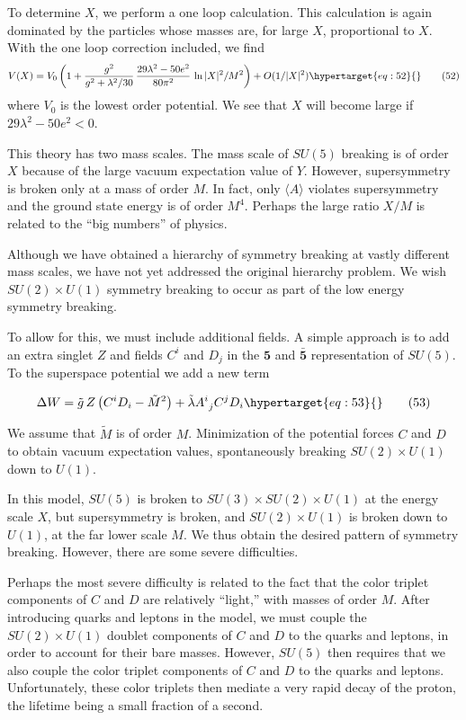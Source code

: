\documentclass[11pt,a4paper]{article}
\newcommand{\eqtarget}[1]{\hypertarget{eq:#1}{\mathstrut}\tag{#1}}
\begin{document}
To determine $X$, we perform a one loop calculation. This calculation
is again dominated by the particles whose masses are, for
large $X$, proportional to $X$. With the one loop correction included,
we find
\begin{equation}
V(X) = V_0 \left(1 + \frac{g^2}{g^2 + \lambda^2/30}\,\frac{29\lambda^2 - 50e^2}{80\pi^2}\,\ln |X|^2/M^2\right) + O(1/|X|^2)
\eqtarget{52}
\end{equation}
where $V_0$ is the lowest order potential. We see that $X$ will become
large if $29\lambda^2 - 50e^2 < 0$.

This theory has two mass scales. The mass scale of $SU(5)$ breaking
is of order $X$ because of the large vacuum expectation value of $Y$.
However, supersymmetry is broken only at a mass of order $M$. In fact,
only $\langle A\rangle$ violates supersymmetry and the ground state energy is of
order $M^4$. Perhaps the large ratio $X/M$ is related to the ``big numbers''
of physics.

Although we have obtained a hierarchy of symmetry breaking at
vastly different mass scales, we have not yet addressed the original
hierarchy problem. We wish $SU(2) \times U(1)$ symmetry breaking to occur
as part of the low energy symmetry breaking.

To allow for this, we must include additional fields. A simple
approach is to add an extra singlet $Z$ and fields $C^i$ and $D_j$ in the $\mathbf{5}$
and $\bar{\mathbf{5}}$ representation of $SU(5)$. To the superspace potential we add
a new term

\begin{equation}
\Delta W = \tilde{g} \, Z \left(C^i D_i - \tilde{M}^2\right) + \tilde{\lambda} A^i_{\ j} C^j D_i
\eqtarget{53}
\end{equation}

We assume that $\tilde{M}$ is of order $M$. Minimization of the potential forces
$C$ and $D$ to obtain vacuum expectation values, spontaneously breaking
$SU(2) \times U(1)$ down to $U(1)$.

In this model, $SU(5)$ is broken to $SU(3) \times SU(2) \times U(1)$ at the
energy scale $X$, but supersymmetry is broken, and $SU(2) \times U(1)$ is
broken down to $U(1)$, at the far lower scale $M$. We thus obtain the
desired pattern of symmetry breaking. However, there are some severe
difficulties.

Perhaps the most severe difficulty is related to the fact that
the color triplet components of $C$ and $D$ are relatively ``light,''
with masses of order $M$. After introducing quarks and leptons in the
model, we must couple the $SU(2) \times U(1)$ doublet components of $C$ and $D$
to the quarks and leptons, in order to account for their bare masses.
However, $SU(5)$ then requires that we also couple the color triplet
components of $C$ and $D$ to the quarks and leptons. Unfortunately,
these color triplets then mediate a very rapid decay of the proton,
the lifetime being a small fraction of a second.
\end{document}
